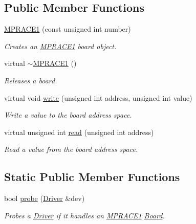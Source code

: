 \subsection*{Public Member Functions}
\begin{CompactItemize}
\item 
\hyperlink{classmprace_1_1MPRACE1_a0}{MPRACE1} (const unsigned int number)
\begin{CompactList}\small\item\em Creates an \hyperlink{classmprace_1_1MPRACE1}{MPRACE1} board object. \item\end{CompactList}\item 
virtual \hyperlink{classmprace_1_1MPRACE1_a1}{$\sim$MPRACE1} ()
\begin{CompactList}\small\item\em Releases a board. \item\end{CompactList}\item 
virtual void \hyperlink{classmprace_1_1MPRACE1_a2}{write} (unsigned int address, unsigned int value)
\begin{CompactList}\small\item\em Write a value to the board address space. \item\end{CompactList}\item 
virtual unsigned int \hyperlink{classmprace_1_1MPRACE1_a3}{read} (unsigned int address)
\begin{CompactList}\small\item\em Read a value from the board address space. \item\end{CompactList}\end{CompactItemize}
\subsection*{Static Public Member Functions}
\begin{CompactItemize}
\item 
bool \hyperlink{classmprace_1_1MPRACE1_e0}{probe} (\hyperlink{classmprace_1_1Driver}{Driver} \&dev)
\begin{CompactList}\small\item\em Probes a \hyperlink{classmprace_1_1Driver}{Driver} if it handles an \hyperlink{classmprace_1_1MPRACE1}{MPRACE1} \hyperlink{classmprace_1_1Board}{Board}. \item\end{CompactList}\end{CompactItemize}
